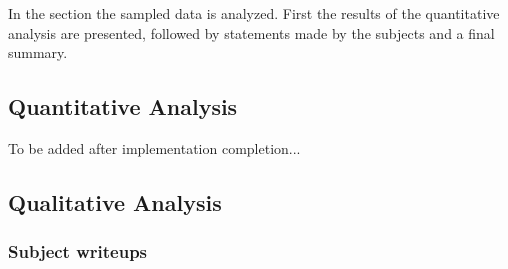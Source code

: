 In the section the sampled data is analyzed. First the results of the quantitative analysis are presented, followed by statements made by the subjects and a final  summary.

\subsection{Quantitative Analysis}

To be added after implementation completion...


\subsection{Qualitative Analysis}

\subsubsection{Subject writeups}



